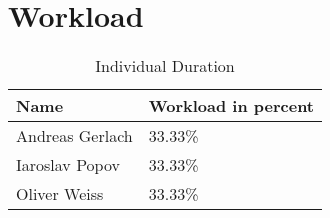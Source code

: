 \section{Workload}
\begin{table}[H]
    \begin{tabular}{|p{}|p{}|}
    \hline
    \textbf{Name} & \textbf{Workload in percent} \\ \hline
    Andreas Gerlach & 33.33\% \\ \hline
Iaroslav Popov & 33.33\% \\ \hline
Oliver Weiss & 33.33\% \\ \hline
    \end{tabular}
    \caption{Individual Duration}
\end{table}
